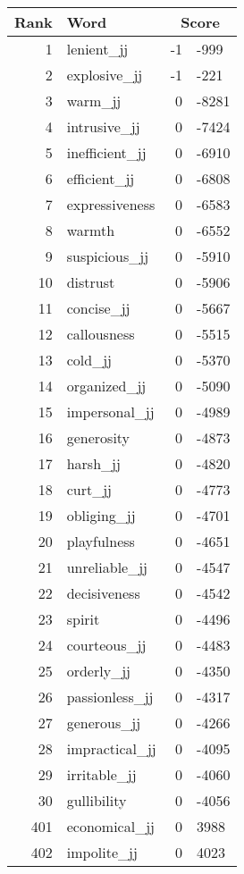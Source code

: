 \begin{longtable}[!htbp]{| rlr@{.}l |}
    \hline
    \textbf{Rank} & \textbf{Word} & \multicolumn{2}{c|}{\textbf{Score}} \\
    \hline
    \endhead
    1 & lenient\_jj & -1 & -999 \\
    2 & explosive\_jj & -1 & -221 \\
    3 & warm\_jj & 0 & -8281 \\
    4 & intrusive\_jj & 0 & -7424 \\
    5 & inefficient\_jj & 0 & -6910 \\
    6 & efficient\_jj & 0 & -6808 \\
    7 & expressiveness & 0 & -6583 \\
    8 & warmth & 0 & -6552 \\
    9 & suspicious\_jj & 0 & -5910 \\
    10 & distrust & 0 & -5906 \\
    11 & concise\_jj & 0 & -5667 \\
    12 & callousness & 0 & -5515 \\
    13 & cold\_jj & 0 & -5370 \\
    14 & organized\_jj & 0 & -5090 \\
    15 & impersonal\_jj & 0 & -4989 \\
    16 & generosity & 0 & -4873 \\
    17 & harsh\_jj & 0 & -4820 \\
    18 & curt\_jj & 0 & -4773 \\
    19 & obliging\_jj & 0 & -4701 \\
    20 & playfulness & 0 & -4651 \\
    21 & unreliable\_jj & 0 & -4547 \\
    22 & decisiveness & 0 & -4542 \\
    23 & spirit & 0 & -4496 \\
    24 & courteous\_jj & 0 & -4483 \\
    25 & orderly\_jj & 0 & -4350 \\
    26 & passionless\_jj & 0 & -4317 \\
    27 & generous\_jj & 0 & -4266 \\
    28 & impractical\_jj & 0 & -4095 \\
    29 & irritable\_jj & 0 & -4060 \\
    30 & gullibility & 0 & -4056 \\
    401 & economical\_jj & 0 & 3988 \\
    402 & impolite\_jj & 0 & 4023 \\

\end{longtable}

